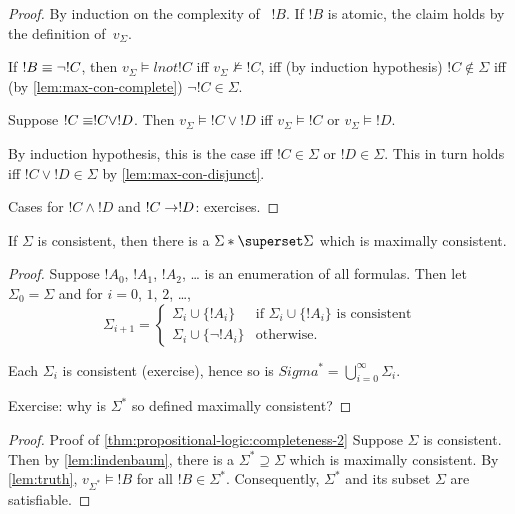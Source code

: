 \documentclass[propositional-logic]{subfiles}
\begin{document}
\begin{proof}
By induction on the complexity of ~$!B$.  If $!B$ is atomic, the claim
holds by the definition of~$v_\Sigma$.

If $!B \equiv \lnot !C$, then $v_\Sigma \models lnot !C$ iff $v_\Sigma
\not\models !C$, iff (by induction hypothesis) $!C \notin \Sigma$ iff
(by \ref{lem:max-con-complete}) $\lnot !C \in \Sigma$.

Suppose $!C \equiv !C \lor !D$.  Then $v_\Sigma \models !C \lor !D$
iff $v_\Sigma \models !C$ or $v_\Sigma \models !D$.

By induction hypothesis, this is the case iff $!C \in \Sigma$ or $!D
\in \Sigma$.  This in turn holds iff $!C \lor !D \in \Sigma$ by
\ref{lem:max-con-disjunct}.

Cases for $!C \land !D$ and $!C \to !D$: exercises.
\end{proof}

\begin{lem}\label{lem:lindenbaum}
If $\Sigma$ is consistent, then there is a $\Sigma* \superset \Sigma$
which is maximally consistent.
\end{lem}

\begin{proof}
Suppose $!A_0$, $!A_1$, $!A_2$, \dots{} is an enumeration of all
formulas.  Then let $\Sigma_0 = \Sigma$ and for $i = 0$, $1$, $2$,
\dots,
\[
\Sigma_{i+1} = 
\begin{cases}
\Sigma_i \cup \{!A_i\} & \text{if $\Sigma_i \cup \{!A_i\}$ is
  consistent}\\ \Sigma_i \cup \{\lnot !A_i\} & \text{otherwise.}
\end{cases}
\] 

Each $\Sigma_i$ is consistent (exercise), hence so is $Sigma^* =
\bigcup_{i=0}^\infty \Sigma_i$.

Exercise: why is $\Sigma^*$ so defined maximally consistent?
\end{proof}

\begin{proof}{Proof of \ref{thm:propositional-logic:completeness-2}} 
Suppose $\Sigma$ is consistent.  Then by \ref{lem:lindenbaum}, there
is a $\Sigma^* \supseteq \Sigma$ which is maximally consistent.  By
\ref{lem:truth}, $v_{\Sigma^*} \models !B$ for all $!B \in \Sigma^*$.
Consequently, $\Sigma^*$ and its subset $\Sigma$ are satisfiable.
\end{proof}
\end{document}
